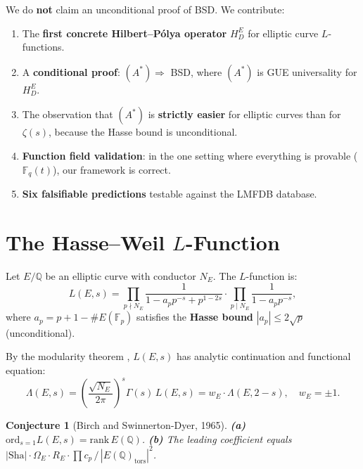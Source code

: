 \documentclass[11pt,a4paper]{article}
\theoremstyle{plain}
\newtheorem{conjecture}[theorem]{Conjecture}
\theoremstyle{definition}
\theoremstyle{remark}
\begin{document}
We do \textbf{not} claim an unconditional proof of BSD. We contribute:
\begin{enumerate}
\item The \textbf{first concrete Hilbert--P\'olya operator} $H_D^E$ for elliptic curve $L$-functions.
\item A \textbf{conditional proof}: $(A^*) \Rightarrow$ BSD, where $(A^*)$ is GUE universality for $H_D^E$.
\item The observation that $(A^*)$ is \textbf{strictly easier} for elliptic curves than for $\zeta(s)$, because the Hasse bound is unconditional.
\item \textbf{Function field validation}: in the one setting where everything is provable ($\mathbb{F}_q(t)$), our framework is correct.
\item \textbf{Six falsifiable predictions} testable against the LMFDB database.
\end{enumerate}

\section{The Hasse--Weil $L$-Function}

Let $E/\mathbb{Q}$ be an elliptic curve with conductor $N_E$. The $L$-function is:
\begin{equation}
L(E,s) = \prod_{p \nmid N_E} \frac{1}{1 - a_p p^{-s} + p^{1-2s}} \cdot \prod_{p \mid N_E} \frac{1}{1 - a_p p^{-s}},
\end{equation}
where $a_p = p + 1 - \#E(\mathbb{F}_p)$ satisfies the \textbf{Hasse bound} $|a_p| \leq 2\sqrt{p}$ (unconditional).

By the modularity theorem \cite{Wiles1995, BCDT2001}, $L(E,s)$ has analytic continuation and functional equation:
\begin{equation}
\Lambda(E,s) = \left(\frac{\sqrt{N_E}}{2\pi}\right)^s \Gamma(s)\, L(E,s) = w_E \cdot \Lambda(E, 2-s), \quad w_E = \pm 1.
\end{equation}

\begin{conjecture}[Birch and Swinnerton-Dyer, 1965]
\textbf{(a)} $\text{ord}_{s=1} L(E,s) = \text{rank}\,E(\mathbb{Q})$.
\textbf{(b)} The leading coefficient equals $|\text{Sha}| \cdot \Omega_E \cdot R_E \cdot \prod c_p \,/\, |E(\mathbb{Q})_{\text{tors}}|^2$.
\end{conjecture}
\end{document}
